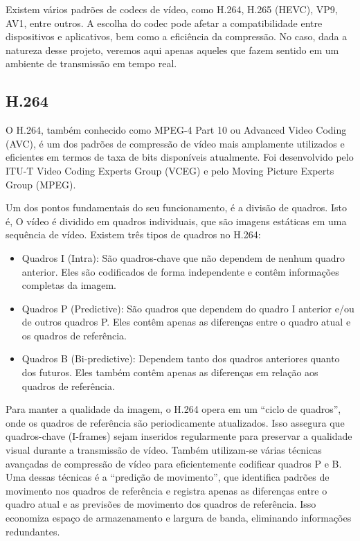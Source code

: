 \documentclass[12pt, %
openright, 
oneside, %
a4paper,    %
brazil]{facom-ufu-abntex2}
\begin{document}
Existem vários padrões de codecs de vídeo, como H.264, H.265 (HEVC), VP9, AV1,
entre outros. A escolha do codec pode afetar a compatibilidade entre
dispositivos e aplicativos, bem como a eficiência da compressão. No caso, dada
a natureza desse projeto, veremos aqui apenas aqueles que fazem sentido em um
ambiente de transmissão em tempo real.

\subsection{H.264}

O H.264, também conhecido como MPEG-4 Part 10 ou Advanced Video Coding (AVC), é
um dos padrões de compressão de vídeo mais amplamente utilizados e eficientes
em termos de taxa de bits disponíveis atualmente. Foi desenvolvido pelo ITU-T
Video Coding Experts Group (VCEG) e pelo Moving Picture Experts Group (MPEG).

Um dos pontos fundamentais do seu funcionamento, é a divisão de quadros. Isto
é, O vídeo é dividido em quadros individuais, que são imagens estáticas em uma
sequência de vídeo. Existem três tipos de quadros no H.264:

\begin{itemize}
	\item Quadros I (Intra): São quadros-chave que não dependem de nenhum
	      quadro anterior. Eles são codificados de forma independente e contêm
	      informações completas da imagem.
	\item Quadros P (Predictive): São quadros que dependem do quadro I
	      anterior e/ou de outros quadros P. Eles contêm apenas as diferenças entre o
	      quadro atual e os quadros de referência.
	\item Quadros B (Bi-predictive): Dependem tanto dos quadros anteriores
	      quanto dos futuros. Eles também contêm apenas as diferenças em relação aos
	      quadros de referência.
\end{itemize}

Para manter a qualidade da imagem, o H.264 opera em um ``ciclo de quadros'',
onde os quadros de referência são periodicamente atualizados. Isso assegura que
quadros-chave (I-frames) sejam inseridos regularmente para preservar a
qualidade visual durante a transmissão de vídeo. Também utilizam-se várias
técnicas avançadas de compressão de vídeo para eficientemente codificar quadros
P e B. Uma dessas técnicas é a ``predição de movimento'', que identifica
padrões de movimento nos quadros de referência e registra apenas as diferenças
entre o quadro atual e as previsões de movimento dos quadros de referência.
Isso economiza espaço de armazenamento e largura de banda, eliminando
informações redundantes.
\end{document}
